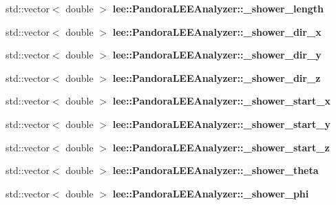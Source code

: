 \begin{DoxyCompactItemize}
\item 
\hypertarget{group__lee_ga88255d9d3a3a401c834d624076c30d5b}{std\-::vector$<$ double $>$ {\bfseries lee\-::\-Pandora\-L\-E\-E\-Analyzer\-::\-\_\-shower\-\_\-length}}\label{group__lee_ga88255d9d3a3a401c834d624076c30d5b}

\item 
\hypertarget{group__lee_gaac6afc45d77fbbfb38addc97038e1893}{std\-::vector$<$ double $>$ {\bfseries lee\-::\-Pandora\-L\-E\-E\-Analyzer\-::\-\_\-shower\-\_\-dir\-\_\-x}}\label{group__lee_gaac6afc45d77fbbfb38addc97038e1893}

\item 
\hypertarget{group__lee_gaa08672578dd6c1729649fa54a1725401}{std\-::vector$<$ double $>$ {\bfseries lee\-::\-Pandora\-L\-E\-E\-Analyzer\-::\-\_\-shower\-\_\-dir\-\_\-y}}\label{group__lee_gaa08672578dd6c1729649fa54a1725401}

\item 
\hypertarget{group__lee_gaee2bf39916f97db6bee077df4020662f}{std\-::vector$<$ double $>$ {\bfseries lee\-::\-Pandora\-L\-E\-E\-Analyzer\-::\-\_\-shower\-\_\-dir\-\_\-z}}\label{group__lee_gaee2bf39916f97db6bee077df4020662f}

\item 
\hypertarget{group__lee_ga8d3d2b24d81dc924d1f972bf3748dd76}{std\-::vector$<$ double $>$ {\bfseries lee\-::\-Pandora\-L\-E\-E\-Analyzer\-::\-\_\-shower\-\_\-start\-\_\-x}}\label{group__lee_ga8d3d2b24d81dc924d1f972bf3748dd76}

\item 
\hypertarget{group__lee_gae12d2a6c7e2d78fc9d7e6f30ce959fa7}{std\-::vector$<$ double $>$ {\bfseries lee\-::\-Pandora\-L\-E\-E\-Analyzer\-::\-\_\-shower\-\_\-start\-\_\-y}}\label{group__lee_gae12d2a6c7e2d78fc9d7e6f30ce959fa7}

\item 
\hypertarget{group__lee_gafef1c0810411173778fa2ea099cbb03f}{std\-::vector$<$ double $>$ {\bfseries lee\-::\-Pandora\-L\-E\-E\-Analyzer\-::\-\_\-shower\-\_\-start\-\_\-z}}\label{group__lee_gafef1c0810411173778fa2ea099cbb03f}

\item 
\hypertarget{group__lee_ga3ad8af27c4c242410ffe4c1e1407e3c0}{std\-::vector$<$ double $>$ {\bfseries lee\-::\-Pandora\-L\-E\-E\-Analyzer\-::\-\_\-shower\-\_\-theta}}\label{group__lee_ga3ad8af27c4c242410ffe4c1e1407e3c0}

\item 
\hypertarget{group__lee_ga97c2d25dc1e253d867353b1c4562967c}{std\-::vector$<$ double $>$ {\bfseries lee\-::\-Pandora\-L\-E\-E\-Analyzer\-::\-\_\-shower\-\_\-phi}}\label{group__lee_ga97c2d25dc1e253d867353b1c4562967c}


\end{DoxyCompactItemize}
